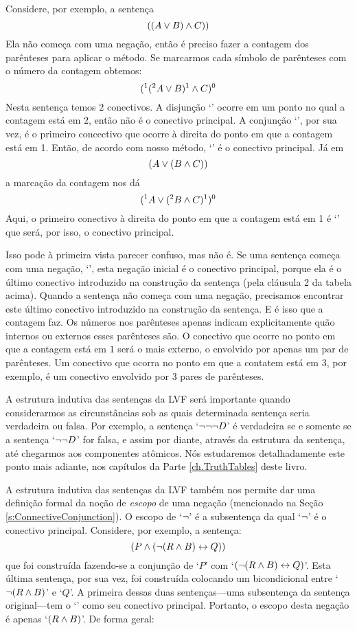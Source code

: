 Considere, por exemplo, a sentença
$$((A \vee B) \wedge C))$$
Ela não começa com uma negação, então é preciso fazer a contagem dos parênteses para aplicar o método.
Se marcarmos cada símbolo de parênteses com o número da contagem obtemos:
$$(^1 (^2 A \vee B)^1 \wedge C)^0$$
Nesta sentença temos $2$ conectivos.
A disjunção `\eor' ocorre em um ponto no qual a contagem está em $2$, então não é o conectivo principal.
A conjunção `\eand', por sua vez, é o primeiro concectivo que ocorre à direita do ponto em que a contagem está em 1.
Então, de acordo com nosso método, `\eand' é o conectivo principal.
Já em
$$(A \vee (B \wedge C))$$
a marcação da contagem nos dá
$$(^1 A \vee (^2 B \wedge C)^1 )^0$$
Aqui, o primeiro conectivo à direita do ponto em que a contagem está em 1 é `\eor' que será, por isso, o conectivo principal.

Isso pode à primeira vista parecer confuso, mas não é.
Se uma sentença começa com uma negação, `\enot', esta negação inicial é o conectivo principal, porque ela é o último conectivo introduzido na construção da sentença (pela cláusula 2 da tabela acima).
Quando a sentença não começa com uma negação, precisamos encontrar este último conectivo introduzido na construção da sentença.
E é isso que a contagem faz.
Os números nos parênteses apenas indicam explicitamente quão internos ou externos esses parênteses são.
O conectivo que ocorre no ponto em que a contagem está em $1$ será o mais externo, o envolvido por apenas um par de parênteses.
Um conectivo que ocorra no ponto em que a contatem está em $3$, por exemplo, é um conectivo envolvido por 3 pares de parênteses.
 
A estrutura indutiva das sentenças da LVF será importante quando considerarmos as circunstâncias sob as quais determinada sentença seria verdadeira ou falsa.
Por exemplo, a sentença `$\neg\neg\neg D$' é verdadeira se e somente se a sentença `$\neg\neg D$' for falsa, e assim por diante, através da estrutura da sentença, até chegarmos aos componentes atômicos.
Nós estudaremos detalhadamente este ponto mais adiante, nos capítulos da Parte \ref{ch.TruthTables} deste livro.

A estrutura indutiva das sentenças da LVF também nos permite dar uma definição formal da noção de \emph{escopo} de uma negação (mencionado na Seção  \ref{s:ConnectiveConjunction}).
O escopo de `$\neg$' é a subsentença da qual `$\neg$' é o conectivo principal.
Considere, por exemplo, a sentença:
$$(P \wedge (\neg (R \wedge B) \leftrightarrow Q))$$
que foi construída fazendo-se a conjunção de `$P$' com \mbox{`$(\neg(R \wedge B) \leftrightarrow Q)$'}.
Esta última sentença, por sua vez, foi construída colocando um bicondicional entre `$\neg(R \wedge B)$' e `$Q$'.
A primeira dessas duas sentenças---uma subsentença da sentença original---tem o `\enot' como seu conectivo principal.
Portanto, o escopo desta negação é apenas `$(R \wedge B)$'.
De forma geral:

